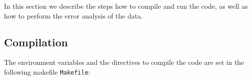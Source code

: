 


In this section we describe the steps how to compile and run the code, as well as how to perform the error analysis of the data.
%
\subsection{Compilation}
\label{sec:compilation}
%
The environment variables and the directives to compile the code are set in the following makefile \texttt{Makefile}:  
